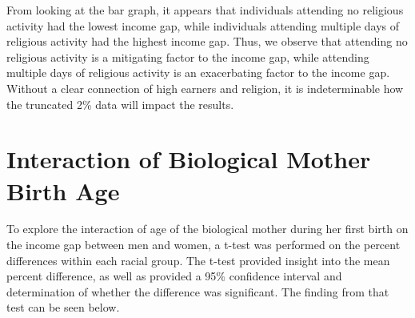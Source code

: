 \documentclass[
]{article}
\begin{document}
From looking at the bar graph, it appears that individuals attending no
religious activity had the lowest income gap, while individuals
attending multiple days of religious activity had the highest income
gap. Thus, we observe that attending no religious activity is a
mitigating factor to the income gap, while attending multiple days of
religious activity is an exacerbating factor to the income gap. Without
a clear connection of high earners and religion, it is indeterminable
how the truncated 2\% data will impact the results.

\hypertarget{interaction-of-biological-mother-birth-age}{%
\section{Interaction of Biological Mother Birth
Age}\label{interaction-of-biological-mother-birth-age}}

To explore the interaction of age of the biological mother during her
first birth on the income gap between men and women, a t-test was
performed on the percent differences within each racial group. The
t-test provided insight into the mean percent difference, as well as
provided a 95\% confidence interval and determination of whether the
difference was significant. The finding from that test can be seen
below.
\end{document}
